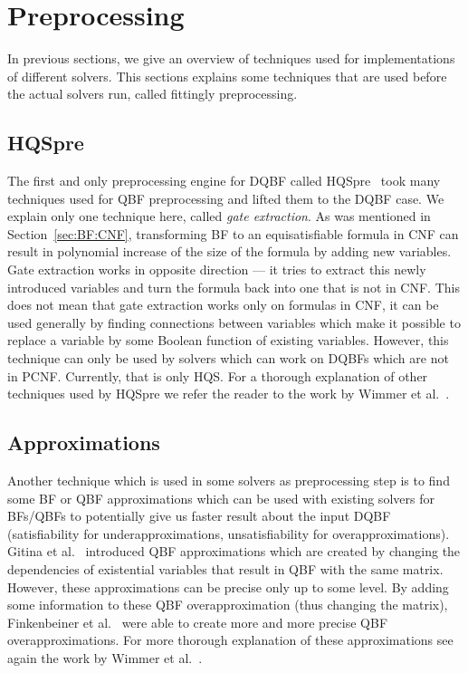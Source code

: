 \documentclass[
  digital, %
  twoside, %
  table,   %
  nolof,     %
  nolot,     %
]{fithesis3}
\theoremstyle{definition}
\theoremstyle{remark}
\begin{document}
\section{Preprocessing}
\label{sec:preprocessing}
In previous sections, we give an overview of techniques used for implementations of different solvers. This sections explains some techniques that are used before the actual solvers run, called fittingly preprocessing.



\subsection{HQSpre}
The first and only preprocessing engine for DQBF called HQSpre~\cite{HQSpre1,HQSpre2,HQSpreJournal} took many techniques used for QBF preprocessing and lifted them to the DQBF case. We explain only one technique here, called \emph{gate extraction}. As was mentioned in Section~\ref{sec:BF:CNF}, transforming BF to an equisatisfiable formula in CNF can result in polynomial increase of the size of the formula by adding new variables. Gate extraction works in opposite direction --- it tries to extract this newly introduced variables and turn the formula back into one that is not in CNF. This does not mean that gate extraction works only on formulas in CNF, it can be used generally by finding connections between variables which make it possible to replace a variable by some Boolean function of existing variables. However, this technique can only be used by solvers which can work on DQBFs which are not in PCNF. Currently, that is only HQS. For a thorough explanation of other techniques used by HQSpre we refer the reader to the work by Wimmer et al.~\cite{HQSpreJournal}. 

\subsection{Approximations}
Another technique which is used in some solvers as preprocessing step is to find some BF or QBF approximations which can be used with existing solvers for BFs/QBFs to potentially give us faster result about the input DQBF (satisfiability for underapproximations, unsatisfiability for overapproximations). Gitina et al.~\cite{HQSsimpleAlg} introduced QBF approximations which are created by changing the dependencies of existential variables that result in QBF with the same matrix. However, these approximations can be precise only up to some level. By adding some information to these QBF overapproximation (thus changing the matrix), Finkenbeiner et al.~\cite{FastDQBFRefutation} were able to create more and more precise QBF overapproximations. For more thorough explanation of these approximations see again the work by Wimmer et al.~\cite[Section~3]{HQSpreJournal}.
\end{document}
